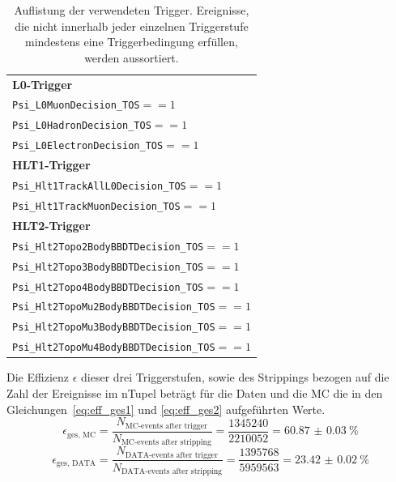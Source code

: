 %
\begin{table}[htb]
  \centering
  \caption{Auflistung der verwendeten Trigger.
  Ereignisse, die nicht innerhalb jeder einzelnen Triggerstufe mindestens eine Triggerbedingung erfüllen, werden aussortiert.}
  \begin{tabular}{l}
    \toprule
    \textbf{L0-Trigger}                                           \\
    \quad\texttt{Psi\_L0MuonDecision\_TOS}\quad$==1$              \\
    \quad\texttt{Psi\_L0HadronDecision\_TOS}\quad$==1$            \\
    \quad\texttt{Psi\_L0ElectronDecision\_TOS}\quad$==1$          \\
    \midrule
    \textbf{HLT1-Trigger}                                         \\
    \quad\texttt{Psi\_Hlt1TrackAllL0Decision\_TOS}\quad$==1$      \\
    \quad\texttt{Psi\_Hlt1TrackMuonDecision\_TOS}\quad$==1$       \\
    \midrule
    \textbf{HLT2-Trigger}                                         \\
    \quad\texttt{Psi\_Hlt2Topo2BodyBBDTDecision\_TOS}\quad$==1$   \\
    \quad\texttt{Psi\_Hlt2Topo3BodyBBDTDecision\_TOS}\quad$==1$   \\
    \quad\texttt{Psi\_Hlt2Topo4BodyBBDTDecision\_TOS}\quad$==1$   \\
    \quad\texttt{Psi\_Hlt2TopoMu2BodyBBDTDecision\_TOS}\quad$==1$ \\
    \quad\texttt{Psi\_Hlt2TopoMu3BodyBBDTDecision\_TOS}\quad$==1$ \\
    \quad\texttt{Psi\_Hlt2TopoMu4BodyBBDTDecision\_TOS}\quad$==1$ \\
    \bottomrule
  \end{tabular}
  \label{tab:trigger}
\end{table}
%
Die Effizienz $\epsilon$ dieser drei Triggerstufen, sowie des Strippings bezogen auf die Zahl der Ereignisse im nTupel beträgt für die Daten und die MC die in den Gleichungen~\ref{eq:eff_ges1} und \ref{eq:eff_ges2} aufgeführten Werte.
%
\begin{equation}
  \epsilon_\text{ges, MC}=\frac{N_\text{MC-events after trigger}}{N_\text{MC-events after stripping}}=\frac{1345240}{2210052}=\SI{60.87(3)}{\percent}
  \label{eq:eff_ges1}
\end{equation}
\begin{equation}
  \epsilon_\text{ges, DATA}=\frac{N_\text{DATA-events after trigger}}{N_\text{DATA-events after stripping}}=\frac{1395768}{5959563}=\SI{23.42(2)}{\percent}
  \label{eq:eff_ges2}
\end{equation}
%
